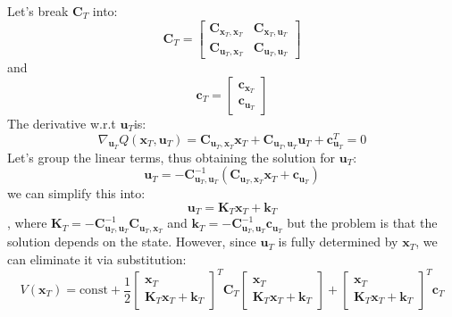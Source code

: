 \documentclass{report}
\begin{document}
Let's break $ \bm{C}_{T}  $ into:
\begin{equation}
		\bm{C}_{T} = 
		\begin{bmatrix} 
				\bm{C}_{\bm{x}_{T}, \bm{x}_{T}} &  \bm{C}_{\bm{x}_{T}, \bm{u}_{T}} \\
				\bm{C}_{\bm{u}_{T}, \bm{x}_{T}} & \bm{C}_{\bm{u}_{T}, \bm{u}_{T}}
		\end{bmatrix} 
\end{equation}
and
\begin{equation}
		\bm{c}_{T} = \begin{bmatrix} \bm{c}_{\bm{x}_{T}} \\ \bm{c}_{\bm{u}_{T}} \end{bmatrix} 
\end{equation}
The derivative w.r.t $ \bm{u}_{T}  $is:
\begin{equation}
\nabla_{ \bm{u}_{T} } Q (\bm{x}_{T}, \bm{u}_{T} ) = 
\bm{C}_{ \bm{u}_{T}, \bm{x}_{T} } \bm{x}_{T} + 
\bm{C}_{ \bm{u}_{T}, \bm{u}_{T} } \bm{u}_{T} +
\bm{c}_{\bm{u}_{T}}^{ T } = 0
\end{equation}
Let's group the linear terms, thus obtaining the solution for $ \bm{u}_{T}  $:
\begin{equation}
\bm{u}_{T} = - \bm{C}_{\bm{u}_{T}, \bm{u}_{T} }^{ -1 } \left( \bm{C}_{\bm{u}_{T}, \bm{x}_{T}}\bm{x}_{T} + \bm{c}_{\bm{u}_{T}} \right) 	
\end{equation}
we can simplify this into:
\begin{equation}
		\bm{u}_{T} = \bm{K}_{T} \bm{x}_{T} + \bm{k}_{T}
\end{equation},
where $ \bm{K}_{T} =- \bm{C}_{\bm{u}_{T}, \bm{u}_{T} }^{ -1 }  \bm{C}_{\bm{u}_{T}, \bm{x}_{T}}   $
and $ \bm{k}_{T} =  - \bm{C}_{\bm{u}_{T}, \bm{u}_{T} }^{ -1 } \bm{c}_{\bm{u}_{T}} $
but the problem is that the solution depends on the state.
However, since $ \bm{u}_{T}  $ is fully determined by $ \bm{x}_{T}  $, we can eliminate it via substitution:
\begin{equation}
V (\bm{x}_{T}) = \text{const} + \frac{1}{2} \begin{bmatrix} \bm{x}_{T} \\ \bm{K}_{T} \bm{x}_{T} + \bm{k}_{T} \end{bmatrix}^{ T } 
\bm{C}_{T} \begin{bmatrix} \bm{x}_{T} \\ \bm{K}_{T} \bm{x}_{T} + \bm{k}_{T} \end{bmatrix} + \begin{bmatrix} \bm{x}_{T} \\ \bm{K}_{T} \bm{x}_{T} + \bm{k}_{T} \end{bmatrix}^{ T } \bm{c}_{T}
\end{equation}
\end{document}
